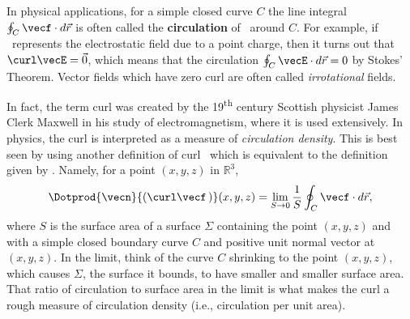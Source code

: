 
In physical applications, for a simple closed curve $C$ the line integral $\oint_C\vecf\cdot d\vec{r}$ is often called the \textbf{circulation} of \vecf\ around $C$. For example, if \vecE\ represents the electrostatic field due to a point charge, then it turns out
that $\curl\vecE = \vec0$, which means that the circulation $\oint_C\vecE\cdot d\vec{r}=0$ by Stokes' Theorem. Vector fields which have zero curl are often called \emph{irrotational} fields.

In fact, the term curl was created by the 19\textsuperscript{th} century Scottish physicist James Clerk Maxwell in his study of electromagnetism, where it is used extensively. In physics, the curl is interpreted as a measure of \emph{circulation density}. This is best seen by using another definition of curl \vecf\ which is equivalent
to the definition given by . Namely, for a point $(x,y,z)$ in $\mathbb{R}^{3}$,
\[
 \Dotprod{\vecn}{(\curl\vecf\,)}(x,y,z)
 = \lim_{S \to 0} \frac{1}{S} \oint_C\vecf\cdot d\vec{r} ,
\]
where $S$ is the surface area of a surface $\Sigma$ containing the point $(x,y,z)$ and with a simple closed boundary curve $C$ and positive unit normal vector \vecn at $(x,y,z)$. In the limit, think of the curve $C$ shrinking to the point $(x,y,z)$, which causes $\Sigma$, the surface it bounds, to have smaller and smaller surface area. That ratio of circulation to surface area in the limit is what makes the curl a rough measure of circulation density (i.e., circulation per unit area).

